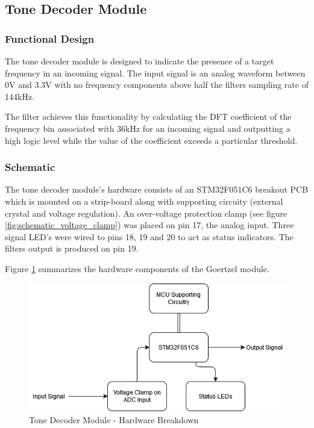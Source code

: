 



\subsection{Tone Decoder Module}

\subsubsection{Functional Design}
The tone decoder module is designed to indicate the presence of a target frequency in an incoming signal. The input signal is an analog waveform between 0V and 3.3V with no frequency components above half the filters sampling rate of 144kHz.

The filter achieves this functionality by calculating the DFT coefficient of the frequency bin associated with 36kHz for an incoming signal and outputting a high logic level while the value of the coefficient exceeds a particular threshold.

\subsubsection{Schematic}
The tone decoder module's hardware consists of an STM32F051C6 breakout PCB which is mounted on a strip-board along with supporting circuity (external crystal and voltage regulation). An over-voltage protection clamp (see figure \ref{fig:schematic_voltage_clamp}) was placed on pin 17, the analog input. Three signal LED's were wired to pins 18, 19 and 20 to act as status indicators. The filters output is produced on pin 19.

Figure \ref{fig:goertzel_schematic_block_form} summarizes the hardware components of the Goertzel module.

\begin{figure}[H]
	\centering
	\includegraphics[width=.8\textwidth]{figures/design/goertzel_schematic_block_form.png}
	\caption{Tone Decoder Module - Hardware Breakdown}
	\label{fig:goertzel_schematic_block_form}
\end{figure}

